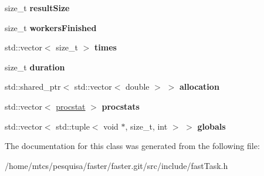 \begin{DoxyCompactItemize}
size\+\_\+t {\bfseries result\+Size}
\item 
\hypertarget{classfaster_1_1fastTask_a5065a797b2f5f031bde3979d664c8fd3}{}\label{classfaster_1_1fastTask_a5065a797b2f5f031bde3979d664c8fd3} 
size\+\_\+t {\bfseries workers\+Finished}
\item 
\hypertarget{classfaster_1_1fastTask_ad59378ade0ac559f412c726137eac964}{}\label{classfaster_1_1fastTask_ad59378ade0ac559f412c726137eac964} 
std\+::vector$<$ size\+\_\+t $>$ {\bfseries times}
\item 
\hypertarget{classfaster_1_1fastTask_a2b7537638f460ca40f9c539aa4950379}{}\label{classfaster_1_1fastTask_a2b7537638f460ca40f9c539aa4950379} 
size\+\_\+t {\bfseries duration}
\item 
\hypertarget{classfaster_1_1fastTask_a84768f55711ad87949579bf0c2ae8783}{}\label{classfaster_1_1fastTask_a84768f55711ad87949579bf0c2ae8783} 
std\+::shared\+\_\+ptr$<$ std\+::vector$<$ double $>$ $>$ {\bfseries allocation}
\item 
\hypertarget{classfaster_1_1fastTask_aac49582ce19072b081c72492c3a819e0}{}\label{classfaster_1_1fastTask_aac49582ce19072b081c72492c3a819e0} 
std\+::vector$<$ \hyperlink{classfaster_1_1procstat}{procstat} $>$ {\bfseries procstats}
\item 
\hypertarget{classfaster_1_1fastTask_a7e0e6d2663f6b913ba7467d4a3810b06}{}\label{classfaster_1_1fastTask_a7e0e6d2663f6b913ba7467d4a3810b06} 
std\+::vector$<$ std\+::tuple$<$ void $\ast$, size\+\_\+t, int $>$ $>$ {\bfseries globals}
\end{DoxyCompactItemize}


The documentation for this class was generated from the following file\+:\begin{DoxyCompactItemize}
\item 
/home/mtcs/pesquisa/faster/faster.\+git/src/include/fast\+Task.\+h\end{DoxyCompactItemize}
